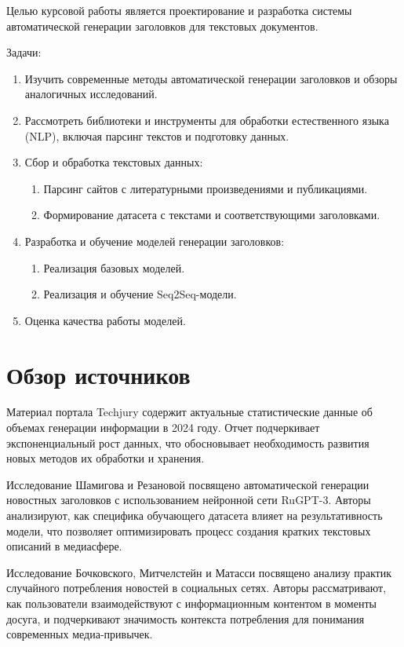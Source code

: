 \documentclass[coursework]{SCWorks}
\begin{document}
    Целью курсовой работы является проектирование и разработка системы автоматической генерации заголовков для текстовых документов.

    Задачи:
    \begin{enumerate}
        \item Изучить современные методы автоматической генерации заголовков и обзоры аналогичных исследований.
        \item Рассмотреть библиотеки и инструменты для обработки естественного языка (NLP), включая парсинг текстов и подготовку данных.
        \item Сбор и обработка текстовых данных:
        \begin{enumerate}
            \item Парсинг сайтов с литературными произведениями и публикациями.
            \item Формирование датасета с текстами и соответствующими заголовками.
        \end{enumerate}
        \item Разработка и обучение моделей генерации заголовков:
        \begin{enumerate}
            \item Реализация базовых моделей.
            \item Реализация и обучение Seq2Seq-модели.
        \end{enumerate}
        \item Оценка качества работы моделей.
    \end{enumerate}


    \section{Обзор источников}

    Материал портала Techjury \cite{techjury2024} содержит актуальные статистические данные об объемах генерации информации в 2024 году. Отчет подчеркивает экспоненциальный рост данных, что обосновывает необходимость развития новых методов их обработки и хранения.

    Исследование Шамигова и Резановой \cite{shamigov_rugpt} посвящено автоматической генерации новостных заголовков с использованием нейронной сети RuGPT-3. Авторы анализируют, как специфика обучающего датасета влияет на результативность модели, что позволяет оптимизировать процесс создания кратких текстовых описаний в медиасфере.

    Исследование Бочковского, Митчелстейн и Матасси \cite{boczkowski2018news} посвящено анализу практик случайного потребления новостей в социальных сетях. Авторы рассматривают, как пользователи взаимодействуют с информационным контентом в моменты досуга, и подчеркивают значимость контекста потребления для понимания современных медиа-привычек.
\end{document}
